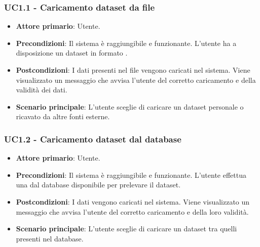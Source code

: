 \subsubsection{UC1.1 - Caricamento dataset da file}

\begin{itemize}
	\item \textbf{Attore primario}: Utente.
	\item \textbf{Precondizioni}: Il sistema è raggiungibile e funzionante. L'utente ha a disposizione un dataset in formato .
	\item \textbf{Postcondizioni}: I dati presenti nel file vengono caricati nel sistema. Viene visualizzato un messaggio che avvisa l'utente del corretto caricamento e della validità dei dati.
	\item \textbf{Scenario principale}: L'utente sceglie di caricare un dataset personale o ricavato da altre fonti esterne.
	
\end{itemize}

\subsubsection{UC1.2 - Caricamento dataset dal database}

\begin{itemize}
	\item \textbf{Attore primario}: Utente.
	\item \textbf{Precondizioni}: Il sistema è raggiungibile e funzionante. L'utente effettua una  dal database disponibile per prelevare il dataset.
	\item \textbf{Postcondizioni}: I dati vengono caricati nel sistema. Viene visualizzato un messaggio che avvisa l'utente del corretto caricamento e della loro validità.
	\item \textbf{Scenario principale}: L'utente sceglie di caricare un dataset tra quelli presenti nel database.
	
\end{itemize}


  